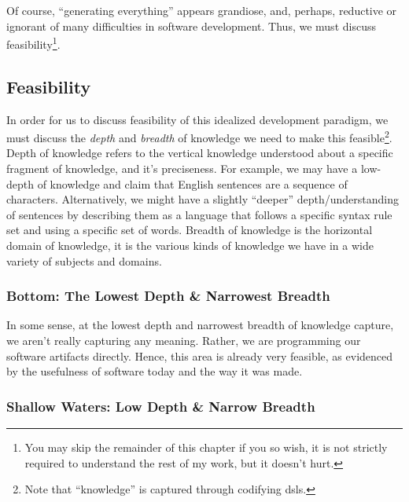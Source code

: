 Of course, ``generating everything'' appears grandiose, and, perhaps, reductive
or ignorant of many difficulties in software development. Thus, we must discuss
feasibility\footnote{You may skip the remainder of this chapter if you so wish,
it is not strictly required to understand the rest of my work, but it doesn't
hurt.}.

\subsection{Feasibility}
\label{chap:ideology:sec:thoughts_of_generation:subsec:feasibility}

In order for us to discuss feasibility of this idealized development paradigm,
we must discuss the \textit{depth} and \textit{breadth} of knowledge we need to
make this feasible\footnote{Note that ``knowledge'' is captured through
codifying \acsp{dsl}.}. Depth of knowledge refers to the vertical knowledge
understood about a specific fragment of knowledge, and it's preciseness. For
example, we may have a low-depth of knowledge and claim that English sentences
are a sequence of characters. Alternatively, we might have a slightly ``deeper''
depth/understanding  of sentences by describing them as a language that follows
a specific syntax rule set and using a specific set of words. Breadth of
knowledge is the horizontal domain of knowledge, it is the various kinds of
knowledge we have in a wide variety of subjects and domains.

\subsubsection{Bottom: The Lowest Depth \& Narrowest Breadth}
\label{chap:ideology:sec:thoughts_of_generation:subsec:feasibility:subsubsec:bottom}

In some sense, at the lowest depth and narrowest breadth of knowledge capture,
we aren't really capturing any meaning. Rather, we are programming our software
artifacts directly. Hence, this area is already very feasible, as evidenced by
the usefulness of software today and the way it was made.

\subsubsection{Shallow Waters: Low Depth \& Narrow Breadth}
\label{chap:ideology:sec:thoughts_of_generation:subsec:feasibility:subsubsec:low}


